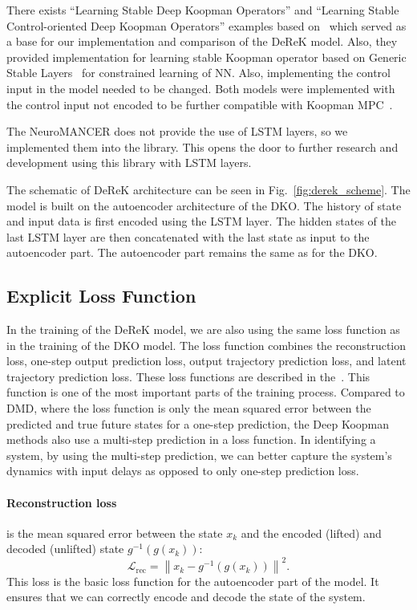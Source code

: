 \documentclass[conference]{IEEEtran}
\begin{document}
There exists ``Learning Stable Deep Koopman Operators'' and ``Learning Stable Control-oriented Deep Koopman Operators'' examples based on~\cite{shi2022deep, korda2020optimal,lusch2018deep} which served as a base for our implementation and comparison of the DeReK model. Also, they provided implementation for learning stable Koopman operator based on Generic Stable Layers~\cite{skomski2021constrained, drgovna2022dissipative, zhang2018stabilizing} for constrained learning of NN. Also, implementing the control input in the model needed to be changed. Both models were implemented with the control input not encoded to be further compatible with Koopman MPC~\cite{korda2018linear}.

The NeuroMANCER does not provide the use of LSTM layers, so we implemented them into the library. This opens the door to further research and development using this library with LSTM layers.

The schematic of DeReK architecture can be seen in Fig.~\ref{fig:derek_scheme}. The model is built on the autoencoder architecture of the DKO. The history of state and input data is first encoded using the LSTM layer. The hidden states of the last LSTM layer are then concatenated with the last state as input to the autoencoder part. The autoencoder part remains the same as for the DKO.

\subsection{Explicit Loss Function}
In the training of the DeReK model, we are also using the same loss function as in the training of the DKO model. The loss function combines the reconstruction loss, one-step output prediction loss, output trajectory prediction loss, and latent trajectory prediction loss. These loss functions are described in the~\cite{lusch2018deep}. This function is one of the most important parts of the training process. Compared to DMD, where the loss function is only the mean squared error between the predicted and true future states for a one-step prediction, the Deep Koopman methods also use a multi-step prediction in a loss function. In identifying a system, by using the multi-step prediction, we can better capture the system's dynamics with input delays as opposed to only one-step prediction loss.

\paragraph*{Reconstruction loss}
is the mean squared error between the state \(x_k\) and the encoded (lifted) and decoded (unlifted) state \(g^{-1}(g(x_k))\):
\begin{equation}
    \mathcal{L}_{\text{rec}} = \left\|x_k - g^{-1}(g(x_k))\right\|^2.
\end{equation}
This loss is the basic loss function for the autoencoder part of the model. It ensures that we can correctly encode and decode the state of the system.
\end{document}
